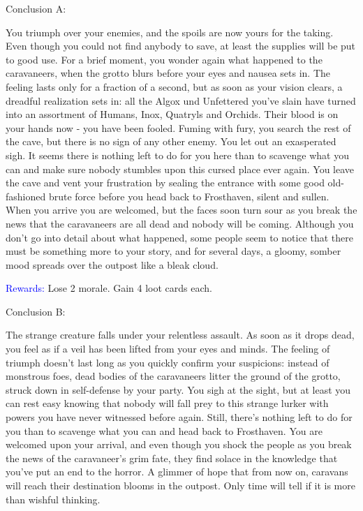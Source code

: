 \documentclass[fontsize=11pt]{scrartcl}
\begin{document}
	\begin{multicols*}{3}
		\begin{center}
		  {\myfont\large{\textcolor{OliveGreen}{Conclusion A:}}}
		\end{center}
		\footnotesize{You triumph over your enemies, and the spoils are now yours for the taking. Even though you could not find anybody to save, at least the supplies will be put to good use. For a brief moment, you wonder again what happened to the caravaneers, when the grotto blurs before your eyes and nausea sets in. The feeling lasts only for a fraction of a second, but as soon as your vision clears, a dreadful realization sets in: all the Algox und Unfettered you’ve slain have turned into an assortment of Humans, Inox, Quatryls and Orchids. Their blood is on your hands now - you have been fooled. Fuming with fury, you search the rest of the cave, but there is no sign of any other enemy. You let out an exasperated sigh. It seems there is nothing left to do for you here than to scavenge what you can and make sure nobody stumbles upon this cursed place ever again.\newline\newline
You leave the cave and vent your frustration by sealing the entrance with some good old-fashioned brute force before you head back to Frosthaven, silent and sullen. When you arrive you are welcomed, but the faces soon turn sour as you break the news that the caravaneers are all dead and nobody will be coming. Although you don’t go into detail about what happened, some people seem to notice that there must be something more to your story, and for several days, a gloomy, somber mood spreads over the outpost like a bleak cloud.}
		\begin{center}
		  {\myfont\normalsize{\textcolor{Blue}{Rewards:}}}\newline
		  \footnotesize{Lose 2 morale.\newline
Gain 4 loot cards each.}
		\end{center}
		\begin{center}
		  {\myfont\large{\textcolor{OliveGreen}{Conclusion B:}}}
		\end{center}
		\footnotesize{The strange creature falls under your relentless assault. As soon as it drops dead, you feel as if a veil has been lifted from your eyes and minds. The feeling of triumph doesn’t last long as you quickly confirm your suspicions: instead of monstrous foes, dead bodies of the caravaneers litter the ground of the grotto, struck down in self-defense by your party. You sigh at the sight, but at least you can rest easy knowing that nobody will fall prey to this strange lurker with powers you have never witnessed before again. Still, there’s nothing left to do for you than to scavenge what you can and head back to Frosthaven. You are welcomed upon your arrival, and even though you shock the people as you break the news of the caravaneer’s grim fate, they find solace in the knowledge that you’ve put an end to the horror. A glimmer of hope that from now on, caravans will reach their destination blooms in the outpost. Only time will tell if it is more than wishful thinking.}

\end{multicols*}
\end{document}
